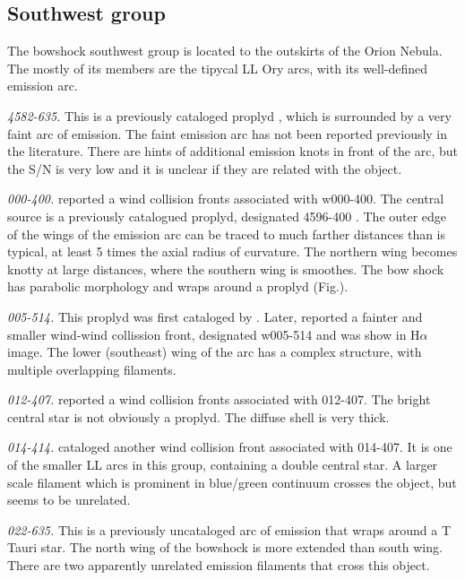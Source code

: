 \documentclass{article}
\newcommand\ha{\ensuremath{\mathrm{H}\alpha}}
\begin{document}
\subsection{Southwest group}
\label{sec:SW}

The bowshock southwest group is located to the outskirts of the Orion Nebula. The mostly of its members are the tipycal LL Ory arcs, with its well-defined emission arc.  

\textit{4582-635.} This is a previously cataloged proplyd \citep{Ricci:2008}, which is surrounded by a very faint arc of emission. The faint emission arc has not been reported previously in the literature. There are hints of additional emission knots in front of the arc, but the S/N is very low and it is unclear if  they are related with the object.

\textit{000-400.} \citet{Bally:2000a} reported a wind collision fronts associated with w000-400. The central source is a previously catalogued proplyd, designated 4596-400 \citep{Ricci:2008}. The outer edge of the wings of the emission arc can be traced to much farther distances than is typical, at least 5 times the axial radius of curvature. The northern wing becomes knotty at large distances, where  the southern wing is smoothes. The bow shock has parabolic morphology and wraps around a proplyd (Fig.).   

\textit{005-514.} This proplyd was first cataloged by \citet{Odell:1996}. Later, \citet{Bally:2000a} reported a fainter and smaller wind-wind collission front, designated w005-514 and was show in \ha{} image. The lower (southeast) wing of the arc has a complex structure, with multiple overlapping filaments.

\textit{012-407.} \citet{Bally:2000a} reported a wind collision fronts associated with 012-407. The bright central star is not obviously a proplyd. The diffuse shell is very thick.  

\textit{014-414.} \citet{Bally:2000a} cataloged another wind collision front associated with 014-407. It is one of the smaller LL arcs in this group, containing a double central star. A larger scale filament which is prominent in blue/green continuum crosses the object, but seems to be unrelated. 

\textit{022-635.} This is a previously uncataloged arc of emission that wraps around a T Tauri star. The north wing of the bowshock is more extended than south wing. There are two apparently unrelated emission filaments that cross this object. 
\end{document}
